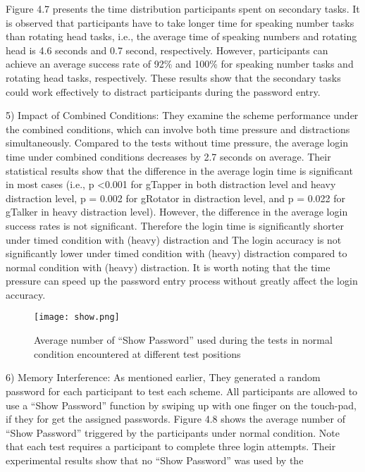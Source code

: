 \documentclass[12pt,a4paper,oneside]{report}
\begin{document}
Figure 4.7 presents the time distribution participants spent
on secondary tasks. It is observed that participants have to
take longer time for speaking number tasks than rotating head
tasks, i.e., the average time of speaking numbers and rotating
head is 4.6 seconds and 0.7 second, respectively. However,
participants can achieve an average success rate of 92\% and
100\% for speaking number tasks and rotating head tasks,
respectively. These results show that the secondary tasks could
work effectively to distract participants during the password
entry.
\par
5) Impact of Combined Conditions: They examine the
scheme performance under the combined conditions, which
can involve both time pressure and distractions simultaneously.
Compared to the tests without time pressure, the average login
time under combined conditions decreases by 2.7 seconds
on average. Their statistical results show that the difference
in the average login time is significant in most cases (i.e.,
p \textless 0.001 for gTapper in both distraction level and heavy
distraction level, p = 0.002 for gRotator in distraction level,
and p = 0.022 for gTalker in heavy distraction level).
However, the difference in the average login success rates is not significant.
 Therefore the login time is significantly shorter under timed condition
with (heavy) distraction and The login accuracy is not significantly lower under timed
condition with (heavy) distraction compared to normal condition with (heavy) distraction. It is worth noting that the time
pressure can speed up the password entry process without
greatly affect the login accuracy.
\begin{figure}[H]
    \begin{center}
        \label{abc}
            \texttt{[image: show.png]}
            \caption{Average number of “Show Password” used during the tests in normal condition encountered at different test positions}
    \end{center}
\end{figure}
6) Memory Interference: As mentioned earlier, They generated
a random password for each participant to test each scheme.
All participants are allowed to use a “Show Password” function by swiping up with one finger on the touch-pad, if they
for
get the assigned passwords. Figure 4.8 shows the average
number of “Show Password” triggered by the participants
under normal condition. Note that each test requires a participant to complete three login attempts. Their experimental
results show that no “Show Password” was used by the
\end{document}
